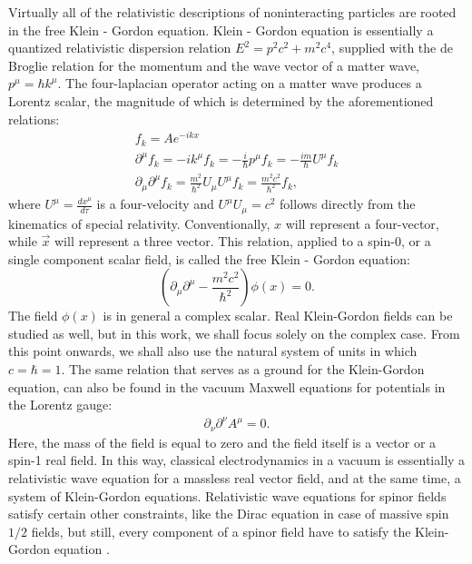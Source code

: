 \documentclass[11pt]{article}
\numberwithin{equation}{section}
\begin{document}
    Virtually all of the relativistic descriptions of noninteracting particles are rooted in the free
    Klein - Gordon equation.
    Klein - Gordon equation is essentially a quantized relativistic
    dispersion relation $E^2 = p^2c^2 + m^2c^4$, supplied with the de Broglie relation for the momentum and the wave vector of a matter wave, $p^\mu = \hbar k^\mu$.
    The four-laplacian operator acting on a matter wave produces a
    Lorentz scalar, the magnitude of which is determined by the aforementioned relations:
    \begin{gather}
     f_k = A e^{-ikx}\\
     \partial^\mu f_{k} = -i k^\mu f_{k} = -\frac{i}{\hbar} p^\mu f_{k} = -\frac{i m}{\hbar} U^\mu f_{k}\\
     \partial_\mu \partial^\mu f_{k} = \frac{m^2}{\hbar^2} U_\mu U^\mu f_{k} = \frac{m^2 c^2}{\hbar^2} f_{k}, \label{relation}
    \end{gather}
    where $U^\mu = \frac{dx^\mu}{d\tau}$ is a four-velocity and $U^\mu U_\mu = c^2$ follows directly from the kinematics of special relativity.
    Conventionally, $x$ will represent a four-vector, while $\vec x$ will represent a three vector.
    This relation, applied to a spin-0, or a single component scalar field, is called the free Klein - Gordon equation:
    \begin{equation}
     \left( \partial_\mu \partial^\mu - \frac{m^2 c^2}{\hbar^2} \right) \phi(x) = 0. \label{kg}
    \end{equation}
    The field $\phi(x)$ is in general a complex scalar. Real Klein-Gordon fields can be studied as well, but in this work, we shall focus solely on the complex case.
    From this point onwards, we shall also use the natural system of units in which $c = \hbar = 1$. %
    The same relation that serves as a ground for the Klein-Gordon equation, can also be found in the vacuum Maxwell equations for potentials in the Lorentz gauge:
    \begin{gather}
     \partial_\nu \partial^\nu A^{\mu} = 0.
    \end{gather}
    Here, the mass of the field is equal to zero and the field itself is a vector or a spin-1 real field.
    In this way, classical electrodynamics in a vacuum is essentially a relativistic wave equation for a massless real vector field,
    and at the same time, a system of Klein-Gordon equations.
    Relativistic wave equations for spinor fields satisfy certain other constraints, like the Dirac equation
    in case of massive spin $1/2$ fields, but still, every component of a spinor field have to satisfy the Klein-Gordon equation \cite{sakurai}.
\end{document}
